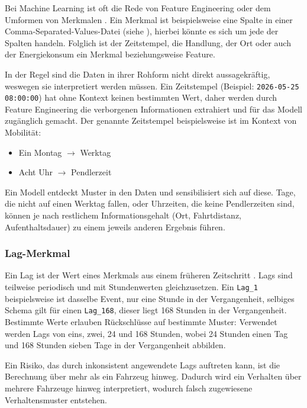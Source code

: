 Bei Machine Learning ist oft die Rede von Feature Engineering oder dem Umformen von Merkmalen \parencite[Kap. 1]{kuhn2019feature}. Ein Merkmal ist beispielsweise eine Spalte in einer Comma-Separated-Values-Datei (siehe ), hierbei könnte es sich um jede der Spalten handeln. Folglich ist der Zeitstempel, die Handlung, der Ort oder auch der Energiekonsum ein Merkmal beziehungsweise Feature.

In der Regel sind die Daten in ihrer Rohform nicht direkt aussagekräftig, weswegen sie interpretiert werden müssen. Ein Zeitstempel (Beispiel: \texttt{2026-05-25 08:00:00}) hat ohne Kontext keinen bestimmten Wert, daher werden durch Feature Engineering die verborgenen Informationen extrahiert und für das Modell zugänglich gemacht. Der genannte Zeitstempel beispielsweise ist im Kontext von Mobilität: 

\begin{itemize}
  \item Ein Montag $\rightarrow$ Werktag
  \item Acht Uhr $\rightarrow$ Pendlerzeit
\end{itemize}

Ein Modell entdeckt Muster in den Daten und sensibilisiert sich auf diese. Tage, die nicht auf einen Werktag fallen, oder Uhrzeiten, die keine Pendlerzeiten sind, können je nach restlichem Informationsgehalt (Ort, Fahrtdistanz, Aufenthaltsdauer) zu einem jeweils anderen Ergebnis führen.

\subsubsection{Lag-Merkmal}

Ein Lag ist der Wert eines Merkmals aus einem früheren Zeitschritt \parencite[Kap. 2.7 \& 2.8]{hyndman2021forecasting}. Lags sind teilweise periodisch und mit Stundenwerten gleichzusetzen. Ein \texttt{Lag\_1} beispielsweise ist dasselbe Event, nur eine Stunde in der Vergangenheit, selbiges Schema gilt für einen \texttt{Lag\_168}, dieser liegt 168 Stunden in der Vergangenheit. Bestimmte Werte erlauben Rückschlüsse auf bestimmte Muster: Verwendet werden Lags von eins, zwei, 24 und 168 Stunden, wobei 24 Stunden einen Tag und 168 Stunden sieben Tage in der Vergangenheit abbilden. 

Ein Risiko, das durch inkonsistent angewendete Lags auftreten kann, ist die Berechnung über mehr als ein Fahrzeug hinweg. Dadurch wird ein Verhalten über mehrere Fahrzeuge hinweg interpretiert, wodurch falsch zugewiesene Verhaltensmuster entstehen. 

